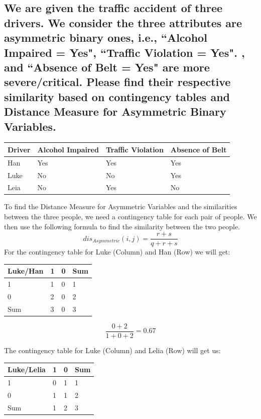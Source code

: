 \documentclass{article}
\begin{document}
\subsection*{We are given the traffic accident of three drivers. We consider the three attributes are asymmetric binary ones, i.e., ``Alcohol Impaired = Yes", ``Traffic Violation = Yes". , and ``Absence of Belt = Yes" are more severe/critical. Please find their respective similarity based on contingency tables and Distance Measure for Asymmetric Binary Variables.}

\begin{table}[h]
    \begin{tabular}{|l|l|l|l|}
    \hline
    Driver & Alcohol Impaired & Traffic Violation & Absence of Belt \\ \hline
    Han    & Yes              & Yes               & Yes             \\ \hline
    Luke   & No               & No                & Yes             \\ \hline
    Leia   & No               & Yes               & No              \\ \hline
    \end{tabular}
    \centering
\end{table}

\noindent
To find the Distance Measure for Asymmetric Variables and the similarities between the three people, we need a contingency table for each pair of people. We then use the following formula to find the similarity between the two people. \[dis_{Asymmetric}(i,j) = \frac{r+s}{q+r+s}\] 
\noindent
For the contingency table for Luke (Column) and Han (Row) we will get:

\begin{table}[h]
    \begin{tabular}{|l|l|l|l|}
    \hline
    Luke/Han & 1 & 0 & Sum \\ \hline
    1 & 1 & 0 & 1 \\ \hline
    0 & 2 & 0 & 2 \\ \hline
    Sum & 3 & 0 & 3 \\ \hline
    \end{tabular}
    \centering
\end{table}

\[\frac{0 + 2}{1 + 0 + 2} = 0.67\]

\noindent
The contingency table for Luke (Column) and Lelia (Row) will get us:

\begin{table}[h]
    \begin{tabular}{|l|l|l|l|}
    \hline
    Luke/Lelia & 1 & 0 & Sum \\ \hline
    1 & 0 & 1 & 1 \\ \hline
    0 & 1 & 1 & 2 \\ \hline
    Sum & 1 & 2 & 3 \\ \hline
    \end{tabular}
    \centering
\end{table}
\end{document}
